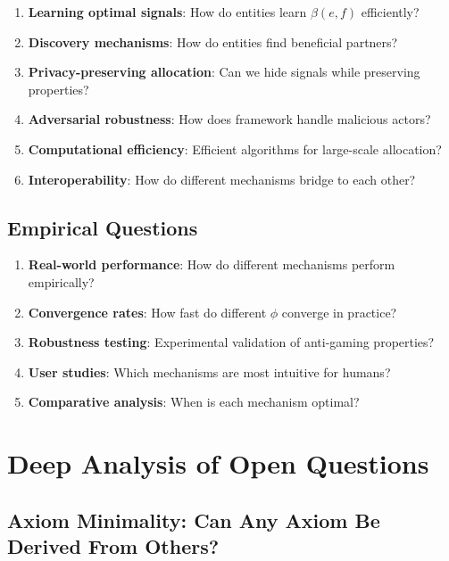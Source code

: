 \documentclass[11pt,a4paper]{article}
\theoremstyle{definition}
\theoremstyle{remark}
\begin{document}
\begin{enumerate}
\item \textbf{Learning optimal signals}: How do entities learn $\beta(e,f)$ efficiently?

\item \textbf{Discovery mechanisms}: How do entities find beneficial partners?

\item \textbf{Privacy-preserving allocation}: Can we hide signals while preserving properties?

\item \textbf{Adversarial robustness}: How does framework handle malicious actors?

\item \textbf{Computational efficiency}: Efficient algorithms for large-scale allocation?

\item \textbf{Interoperability}: How do different mechanisms bridge to each other?
\end{enumerate}

\subsection{Empirical Questions}

\begin{enumerate}
\item \textbf{Real-world performance}: How do different mechanisms perform empirically?

\item \textbf{Convergence rates}: How fast do different $\phi$ converge in practice?

\item \textbf{Robustness testing}: Experimental validation of anti-gaming properties?

\item \textbf{User studies}: Which mechanisms are most intuitive for humans?

\item \textbf{Comparative analysis}: When is each mechanism optimal?
\end{enumerate}

\section{Deep Analysis of Open Questions}

\subsection{Axiom Minimality: Can Any Axiom Be Derived From Others?}
\label{sec:axiom-minimality}
\end{document}
